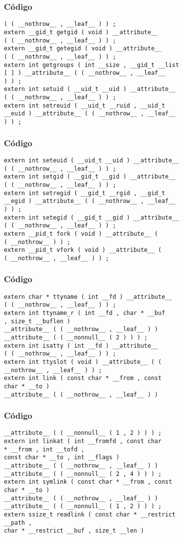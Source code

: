 \documentclass{beamer}
\begin{document}
\begin{frame}[fragile]
\frametitle{C\'odigo}
\begin{verbatim}
( ( __nothrow__ , __leaf__ ) ) ; 
extern __gid_t getgid ( void ) __attribute__ 
( ( __nothrow__ , __leaf__ ) ) ; 
extern __gid_t getegid ( void ) __attribute__ 
( ( __nothrow__ , __leaf__ ) ) ; 
extern int getgroups ( int __size , __gid_t __list 
[ ] ) __attribute__ ( ( __nothrow__ , __leaf__ 
) ) ; 
extern int setuid ( __uid_t __uid ) __attribute__ 
( ( __nothrow__ , __leaf__ ) ) ; 
extern int setreuid ( __uid_t __ruid , __uid_t 
__euid ) __attribute__ ( ( __nothrow__ , __leaf__ 
) ) ; 
\end{verbatim}
\end{frame}
\begin{frame}[fragile]
\frametitle{C\'odigo}
\begin{verbatim}
extern int seteuid ( __uid_t __uid ) __attribute__ 
( ( __nothrow__ , __leaf__ ) ) ; 
extern int setgid ( __gid_t __gid ) __attribute__ 
( ( __nothrow__ , __leaf__ ) ) ; 
extern int setregid ( __gid_t __rgid , __gid_t 
__egid ) __attribute__ ( ( __nothrow__ , __leaf__ 
) ) ; 
extern int setegid ( __gid_t __gid ) __attribute__ 
( ( __nothrow__ , __leaf__ ) ) ; 
extern __pid_t fork ( void ) __attribute__ ( 
( __nothrow__ ) ) ; 
extern __pid_t vfork ( void ) __attribute__ ( 
( __nothrow__ , __leaf__ ) ) ; 
\end{verbatim}
\end{frame}
\begin{frame}[fragile]
\frametitle{C\'odigo}
\begin{verbatim}
extern char * ttyname ( int __fd ) __attribute__ 
( ( __nothrow__ , __leaf__ ) ) ; 
extern int ttyname_r ( int __fd , char * __buf 
, size_t __buflen ) 
__attribute__ ( ( __nothrow__ , __leaf__ ) ) 
__attribute__ ( ( __nonnull__ ( 2 ) ) ) ; 
extern int isatty ( int __fd ) __attribute__ 
( ( __nothrow__ , __leaf__ ) ) ; 
extern int ttyslot ( void ) __attribute__ ( ( 
__nothrow__ , __leaf__ ) ) ; 
extern int link ( const char * __from , const 
char * __to ) 
__attribute__ ( ( __nothrow__ , __leaf__ ) ) 
\end{verbatim}
\end{frame}
\begin{frame}[fragile]
\frametitle{C\'odigo}
\begin{verbatim}
__attribute__ ( ( __nonnull__ ( 1 , 2 ) ) ) ; 
extern int linkat ( int __fromfd , const char 
* __from , int __tofd , 
const char * __to , int __flags ) 
__attribute__ ( ( __nothrow__ , __leaf__ ) ) 
__attribute__ ( ( __nonnull__ ( 2 , 4 ) ) ) ; 
extern int symlink ( const char * __from , const 
char * __to ) 
__attribute__ ( ( __nothrow__ , __leaf__ ) ) 
__attribute__ ( ( __nonnull__ ( 1 , 2 ) ) ) ; 
extern ssize_t readlink ( const char * __restrict 
__path , 
char * __restrict __buf , size_t __len ) 
\end{verbatim}
\end{frame}
\end{document}

